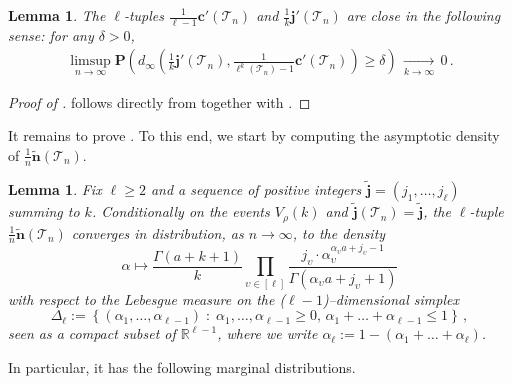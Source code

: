 \documentclass{article}
\newtheorem{lemma}[theorem]{Lemma}
\theoremstyle{remark}
\newcommand{\bR}{\mathbb{R}}
\newcommand{\cv}[1]{\,\underset{#1}{\longrightarrow}\,}
\newcommand{\cT}{\mathcal{T}}
\newcommand{\bc}{\mathbf{c}}
\newcommand{\bj}{\mathbf{j}}
\newcommand{\bn}{\mathbf{n}}
\newcommand{\wbj}{\widetilde{\bj}}
\newcommand{\wbn}{\widetilde{\bn}}
\newcommand{\prob}[1]{\mathbf{P}{\left(#1\right)}}
\begin{document}
\begin{lemma}\label{lem: proportionality tilde j tilde c}
    The $\ell$-tuples $\frac{1}{\ell-1} \bc'(\cT_n)$ and $\frac1k\bj'(\cT_n)$ are close in the following sense:
    for any $\delta>0$,
    \begin{align*}
    \limsup_{n \rightarrow \infty} \prob{d_\infty{\left( \frac1k \bj'(\cT_n), \frac{1}{\ell^k(\cT_n)-1} \bc'(\cT_n) \right)}
    \ge \delta} 
    \cv{k\to\infty} 0 \,.
    \end{align*}
\end{lemma}

\begin{proof}[Proof of ]
 follows directly from  together with .    
\end{proof}

It remains to prove . 
To this end, we start by computing the asymptotic density of $\frac1n \wbn(\cT_n)$.

\begin{lemma}\label{lem: asymptotic density of tilde n conditional tilde j}
    Fix $\ell\ge2$ and a sequence of positive integers $\wbj=(j_1, \dots, j_\ell)$ summing to $k$.
    Conditionally on the events $V_\rho(k)$ and $\wbj(\cT_n) = \wbj$, the $\ell$-tuple $\frac1n \wbn(\cT_n)$ converges in distribution, as $n\to\infty$, to the density 
    \begin{equation*}
        \alpha \mapsto \frac{\Gamma(a+k+1)}{k} \prod_{\upsilon\in [\ell]} \frac{j_\upsilon \cdot \alpha_\upsilon^{\alpha_\upsilon a+j_\upsilon-1}}{\Gamma(\alpha_\upsilon a + j_\upsilon+1)}
    \end{equation*}
    with respect to the Lebesgue measure on the ($\ell\!-\!1$)--dimensional simplex 
    \[
        \Delta_{\ell} := \left\{ (\alpha_1,\dots,\alpha_{\ell-1}) \;:\; \alpha_1,\dots,\alpha_{\ell-1} \ge 0 ,\, \alpha_1+\dots+\alpha_{\ell-1} \le 1 \right\} \,,
    \]
    seen as a compact subset of $\bR^{\ell-1}$, where we write $\alpha_\ell := 1 - (\alpha_1+\dots+\alpha_\ell)$.
\end{lemma}

In particular, it has the following marginal distributions.
\end{document}
